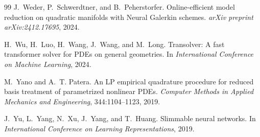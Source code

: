 \begin{thebibliography}{99}
J.~Weder, P.~Schwerdtner, and B.~Peherstorfer.
\newblock Online-efficient model reduction on quadratic manifolds with {Neural
Galerkin} schemes.
\newblock \emph{arXiv preprint arXiv:2412.17695}, 2024.

H.~Wu, H.~Luo, H.~Wang, J.~Wang, and M.~Long.
\newblock Transolver: A fast transformer solver for PDEs on general
geometries.
\newblock In \emph{International Conference on Machine Learning}, 2024.

M.~Yano and A.~T. Patera.
\newblock An LP empirical quadrature procedure for reduced basis
treatment of parametrized nonlinear PDEs.
\newblock \emph{Computer Methods in Applied Mechanics and Engineering},
344:1104--1123, 2019.

J.~Yu, L.~Yang, N.~Xu, J.~Yang, and T.~Huang.
\newblock Slimmable neural networks.
\newblock In \emph{International Conference on Learning Representations},
2019.

\end{thebibliography}
